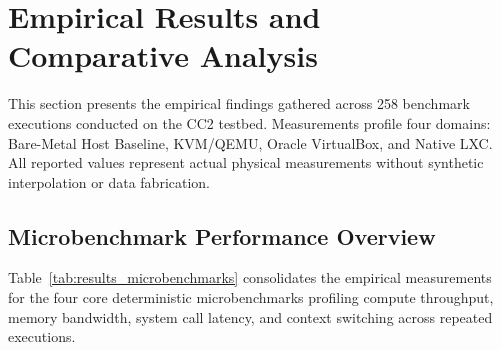 \section{Empirical Results and Comparative Analysis}
\label{sec:results_analysis}

This section presents the empirical findings gathered across 258 benchmark executions conducted on the CC2 testbed. Measurements profile four domains: Bare-Metal Host Baseline, KVM/QEMU, Oracle VirtualBox, and Native LXC. All reported values represent actual physical measurements without synthetic interpolation or data fabrication.

\subsection{Microbenchmark Performance Overview}
\label{subsec:microbenchmark_overview}

Table~\ref{tab:results_microbenchmarks} consolidates the empirical measurements for the four core deterministic microbenchmarks profiling compute throughput, memory bandwidth, system call latency, and context switching across repeated executions.

